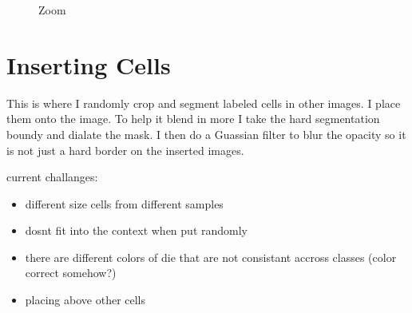 \documentclass[ms,electronic,oneside,twosidetoc,letterpaper,chaptercenter,parttop]{byumsphd}
\begin{document}
\begin{figure}[H]
  \centering
   \quad
   \quad
   \quad
   \quad
  \caption{Zoom}
\end{figure}

\section{Inserting Cells}

This is where I randomly crop and segment labeled cells in other images. I place them onto
the image. To help it blend in more I take the hard segmentation boundy and dialate the mask.
I then do a Guassian filter to blur the opacity so it is not just a hard border on the
inserted images.

current challanges:

\begin{itemize}
  \item different size cells from different samples
  \item dosnt fit into the context when put randomly
  \item there are different colors of die that are not consistant accross classes (color correct somehow?)
  \item placing above other cells
\end{itemize}
\end{document}
